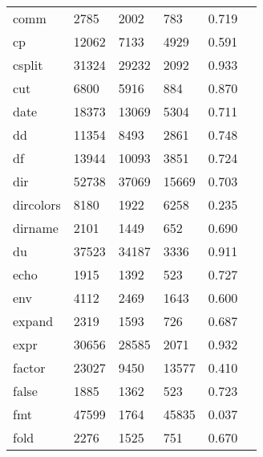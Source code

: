 \begin{longtable}{lp{2.20cm}p{2.20cm}p{2.20cm}p{2.20cm}p{2.20cm}}
comm      &                     2785 &         2002 &           783 &                    0.719 \\
cp        &                    12062 &         7133 &          4929 &                    0.591 \\
csplit    &                    31324 &        29232 &          2092 &                    0.933 \\
cut       &                     6800 &         5916 &           884 &                    0.870 \\
date      &                    18373 &        13069 &          5304 &                    0.711 \\
dd        &                    11354 &         8493 &          2861 &                    0.748 \\
df        &                    13944 &        10093 &          3851 &                    0.724 \\
dir       &                    52738 &        37069 &         15669 &                    0.703 \\
dircolors &                     8180 &         1922 &          6258 &                    0.235 \\
dirname   &                     2101 &         1449 &           652 &                    0.690 \\
du        &                    37523 &        34187 &          3336 &                    0.911 \\
echo      &                     1915 &         1392 &           523 &                    0.727 \\
env       &                     4112 &         2469 &          1643 &                    0.600 \\
expand    &                     2319 &         1593 &           726 &                    0.687 \\
expr      &                    30656 &        28585 &          2071 &                    0.932 \\
factor    &                    23027 &         9450 &         13577 &                    0.410 \\
false     &                     1885 &         1362 &           523 &                    0.723 \\
fmt       &                    47599 &         1764 &         45835 &                    0.037 \\
fold      &                     2276 &         1525 &           751 &                    0.670 \\

\end{longtable}
